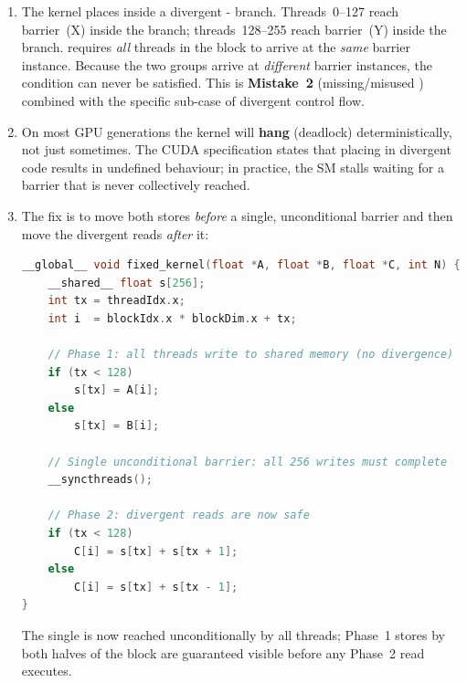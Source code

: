 \begin{enumerate}[label=(\alph*)]
  \item The kernel places  inside a divergent
        - branch.  Threads~0--127 reach barrier~(X)
        inside the  branch; threads~128--255 reach barrier~(Y)
        inside the  branch.   requires
        \emph{all} threads in the block to arrive at the \emph{same} barrier
        instance.  Because the two groups arrive at \emph{different} barrier
        instances, the condition can never be satisfied.  This is
        \textbf{Mistake~2} (missing/misused ) combined
        with the specific sub-case of divergent control flow.

  \item On most GPU generations the kernel will \textbf{hang} (deadlock)
        deterministically, not just sometimes.  The CUDA specification states that
        placing  in divergent code results in undefined
        behaviour; in practice, the SM stalls waiting for a barrier that is never
        collectively reached.

  \item The fix is to move both stores \emph{before} a single, unconditional
        barrier and then move the divergent reads \emph{after} it:

\begin{lstlisting}[language=C++]
__global__ void fixed_kernel(float *A, float *B, float *C, int N) {
    __shared__ float s[256];
    int tx = threadIdx.x;
    int i  = blockIdx.x * blockDim.x + tx;

    // Phase 1: all threads write to shared memory (no divergence)
    if (tx < 128)
        s[tx] = A[i];
    else
        s[tx] = B[i];

    // Single unconditional barrier: all 256 writes must complete
    __syncthreads();

    // Phase 2: divergent reads are now safe
    if (tx < 128)
        C[i] = s[tx] + s[tx + 1];
    else
        C[i] = s[tx] + s[tx - 1];
}
\end{lstlisting}

        The single  is now reached unconditionally by
        all threads; Phase~1 stores by both halves of the block are guaranteed
        visible before any Phase~2 read executes.
\end{enumerate}

